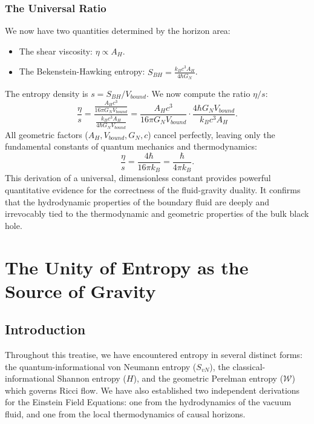 \documentclass[11pt, letterpaper]{report}
\theoremstyle{plain} %
\theoremstyle{definition} %
\theoremstyle{remark} %
\begin{document}
\subsection{The Universal Ratio}
We now have two quantities determined by the horizon area:
\begin{itemize}
    \item The shear viscosity: $\eta \propto A_H$.
    \item The Bekenstein-Hawking entropy: $S_{BH} = \frac{k_B c^3 A_H}{4\hbar G_N}$.
\end{itemize}
The entropy density is $s = S_{BH}/V_{bound}$. We now compute the ratio $\eta/s$:
\begin{equation}
    \frac{\eta}{s} = \frac{\frac{A_H c^3}{16\pi G_N V_{bound}}}{\frac{k_B c^3 A_H}{4\hbar G_N V_{bound}}} = \frac{A_H c^3}{16\pi G_N V_{bound}} \cdot \frac{4\hbar G_N V_{bound}}{k_B c^3 A_H}.
\end{equation}
All geometric factors ($A_H, V_{bound}, G_N, c$) cancel perfectly, leaving only the fundamental constants of quantum mechanics and thermodynamics:
\begin{equation}
    \boxed{\frac{\eta}{s} = \frac{4\hbar}{16\pi k_B} = \frac{\hbar}{4\pi k_B}}.
\end{equation}
This derivation of a universal, dimensionless constant provides powerful quantitative evidence for the correctness of the fluid-gravity duality. It confirms that the hydrodynamic properties of the boundary fluid are deeply and irrevocably tied to the thermodynamic and geometric properties of the bulk black hole.

\appendix
\chapter{The Unity of Entropy as the Source of Gravity}
\label{app:unity_of_entropy}

\section{Introduction}

Throughout this treatise, we have encountered entropy in several distinct forms: the quantum-informational von Neumann entropy ($S_{vN}$), the classical-informational Shannon entropy ($H$), and the geometric Perelman entropy ($\mathcal{W}$) which governs Ricci flow. We have also established two independent derivations for the Einstein Field Equations: one from the hydrodynamics of the vacuum fluid, and one from the local thermodynamics of causal horizons.
\end{document}
